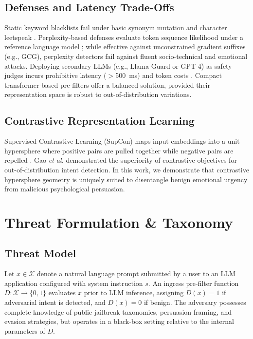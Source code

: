 \documentclass[journal]{IEEEtran}
\begin{document}
\subsection{Defenses and Latency Trade-Offs}
Static keyword blacklists fail under basic synonym mutation and character leetspeak \cite{qiu2020adversarial}. Perplexity-based defenses evaluate token sequence likelihood under a reference language model \cite{alon2024detecting}; while effective against unconstrained gradient suffixes (e.g., GCG), perplexity detectors fail against fluent socio-technical and emotional attacks. Deploying secondary LLMs (e.g., Llama-Guard or GPT-4) as safety judges incurs prohibitive latency ($>$500~ms) and token costs \cite{kumar2024empirical}. Compact transformer-based pre-filters offer a balanced solution, provided their representation space is robust to out-of-distribution variations.

\subsection{Contrastive Representation Learning}
Supervised Contrastive Learning (SupCon) maps input embeddings into a unit hypersphere where positive pairs are pulled together while negative pairs are repelled \cite{khosla2023supervised}. Gao \textit{et al.} \cite{gao2023contrastive} demonstrated the superiority of contrastive objectives for out-of-distribution intent detection. In this work, we demonstrate that contrastive hypersphere geometry is uniquely suited to disentangle benign emotional urgency from malicious psychological persuasion.

\section{Threat Formulation \& Taxonomy}
\subsection{Threat Model}
Let $x \in \mathcal{X}$ denote a natural language prompt submitted by a user to an LLM application configured with system instruction $s$. An ingress pre-filter function $D: \mathcal{X} \to \{0, 1\}$ evaluates $x$ prior to LLM inference, assigning $D(x) = 1$ if adversarial intent is detected, and $D(x) = 0$ if benign. The adversary possesses complete knowledge of public jailbreak taxonomies, persuasion framing, and evasion strategies, but operates in a black-box setting relative to the internal parameters of $D$.
\end{document}
